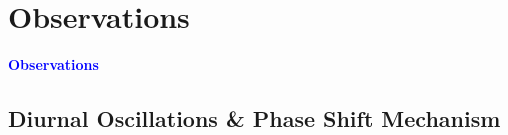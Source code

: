\documentclass[8pt, aspectratio=169]{beamer}
\begin{document}
\section{Observations}
\begin{frame}
    \begin{center}
        \Huge \textcolor{blue}{\textbf{Observations}} \\
    \end{center}
\end{frame}

\subsection{Diurnal Oscillations \& Phase Shift Mechanism}
\end{document}
